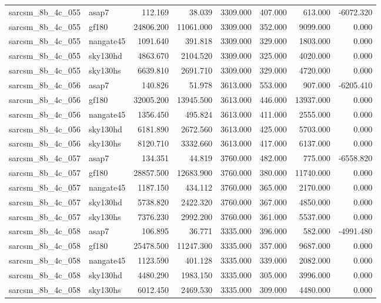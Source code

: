 \begin{tabular}{llrrrrrr}
sarcsm\_8b\_4c\_055 & asap7 & 112.169 & 38.039 & 3309.000 & 407.000 & 613.000 & -6072.320 \\
sarcsm\_8b\_4c\_055 & gf180 & 24806.200 & 11061.000 & 3309.000 & 352.000 & 9099.000 & 0.000 \\
sarcsm\_8b\_4c\_055 & nangate45 & 1091.640 & 391.818 & 3309.000 & 329.000 & 1803.000 & 0.000 \\
sarcsm\_8b\_4c\_055 & sky130hd & 4863.670 & 2104.520 & 3309.000 & 325.000 & 4020.000 & 0.000 \\
sarcsm\_8b\_4c\_055 & sky130hs & 6639.810 & 2691.710 & 3309.000 & 329.000 & 4720.000 & 0.000 \\
sarcsm\_8b\_4c\_056 & asap7 & 140.826 & 51.978 & 3613.000 & 553.000 & 907.000 & -6205.410 \\
sarcsm\_8b\_4c\_056 & gf180 & 32005.200 & 13945.500 & 3613.000 & 446.000 & 13937.000 & 0.000 \\
sarcsm\_8b\_4c\_056 & nangate45 & 1356.450 & 495.824 & 3613.000 & 411.000 & 2555.000 & 0.000 \\
sarcsm\_8b\_4c\_056 & sky130hd & 6181.890 & 2672.560 & 3613.000 & 425.000 & 5703.000 & 0.000 \\
sarcsm\_8b\_4c\_056 & sky130hs & 8120.710 & 3332.660 & 3613.000 & 417.000 & 6137.000 & 0.000 \\
sarcsm\_8b\_4c\_057 & asap7 & 134.351 & 44.819 & 3760.000 & 482.000 & 775.000 & -6558.820 \\
sarcsm\_8b\_4c\_057 & gf180 & 28857.500 & 12683.900 & 3760.000 & 380.000 & 11740.000 & 0.000 \\
sarcsm\_8b\_4c\_057 & nangate45 & 1187.150 & 434.112 & 3760.000 & 365.000 & 2170.000 & 0.000 \\
sarcsm\_8b\_4c\_057 & sky130hd & 5738.820 & 2422.320 & 3760.000 & 367.000 & 4850.000 & 0.000 \\
sarcsm\_8b\_4c\_057 & sky130hs & 7376.230 & 2992.200 & 3760.000 & 361.000 & 5537.000 & 0.000 \\
sarcsm\_8b\_4c\_058 & asap7 & 106.895 & 36.771 & 3335.000 & 396.000 & 582.000 & -4991.480 \\
sarcsm\_8b\_4c\_058 & gf180 & 25478.500 & 11247.300 & 3335.000 & 357.000 & 9687.000 & 0.000 \\
sarcsm\_8b\_4c\_058 & nangate45 & 1123.590 & 401.128 & 3335.000 & 339.000 & 2082.000 & 0.000 \\
sarcsm\_8b\_4c\_058 & sky130hd & 4480.290 & 1983.150 & 3335.000 & 305.000 & 3996.000 & 0.000 \\
sarcsm\_8b\_4c\_058 & sky130hs & 6012.450 & 2469.530 & 3335.000 & 309.000 & 4480.000 & 0.000 \\

\end{tabular}
